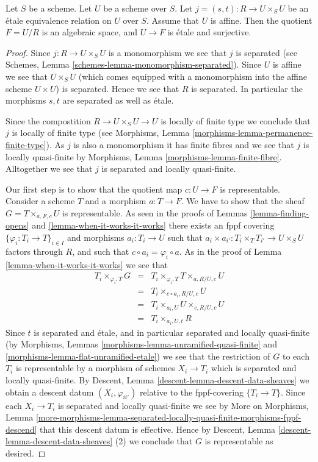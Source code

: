 \begin{lemma}
\label{lemma-presentation-quasi-compact}
Let $S$ be a scheme.
Let $U$ be a scheme over $S$.
Let $j = (s, t) : R \to U \times_S U$
be an \'etale equivalence relation on $U$ over $S$.
Assume that $U$ is affine. Then the quotient $F = U/R$
is an algebraic space, and $U \to F$ is \'etale and surjective.
\end{lemma}

\begin{proof}
Since $j : R \to U \times_S U$ is a monomorphism we see that $j$ is separated
(see Schemes, Lemma \ref{schemes-lemma-monomorphism-separated}).
Since $U$ is affine we see that $U \times_S U$
(which comes equipped with a monomorphism into the affine scheme
$U \times U$) is separated. Hence we see that $R$ is separated.
In particular the morphisms $s, t$ are separated as well as \'etale.

\medskip\noindent
Since the compostition $R \to U \times_S U \to U$ is
locally of finite type we conclude that
$j$ is locally of finite type (see
Morphisms, Lemma \ref{morphisms-lemma-permanence-finite-type}).
As $j$ is also a monomorphism it has finite fibres and
we see that $j$ is locally quasi-finite by
Morphisms, Lemma \ref{morphisms-lemma-finite-fibre}.
Alltogether we see that $j$ is separated and locally quasi-finite.

\medskip\noindent
Our first step is to show that the quotient map
$c : U \to F$ is representable.
Consider a scheme $T$ and a morphism $a : T \to F$.
We have to show that the sheaf $G = T \times_{a, F, c} U$
is representable.
As seen in the proofs of Lemmas \ref{lemma-finding-opens} and
\ref{lemma-when-it-works-it-works} there exists an fppf covering
$\{\varphi_i : T_i \to T\}_{i \in I}$ and morphisms $a_i : T_i \to U$
such that $a_i \times a_{i'} : T_i \times_T T_{i'} \to U \times_S U$
factors through $R$, and such that $c \circ a_i = \varphi_i \circ a$.
As in the proof of Lemma \ref{lemma-when-it-works-it-works} we see that
\begin{eqnarray*}
T_i \times_{\varphi_i, T} G & = &
T_i \times_{\varphi_i, T} T \times_{a, R/U, c} U \\
& = & T_i \times_{c \circ a_i, R/U, c} U \\
& = & T_i \times_{a_i, U} U \times_{c, R/U, c} U \\
& = & T_i \times_{a_i, U, t} R
\end{eqnarray*}
Since $t$ is separated and \'etale, and in particular
separated and locally quasi-finite (by Morphisms, Lemmas
\ref{morphisms-lemma-unramified-quasi-finite} and
\ref{morphisms-lemma-flat-unramified-etale})
we see that the restriction
of $G$ to each $T_i$ is representable by a morphism of schemes
$X_i \to T_i$ which is separated and locally quasi-finite. By
Descent, Lemma \ref{descent-lemma-descent-data-sheaves}
we obtain a descent datum $(X_i, \varphi_{ii'})$ relative
to the fppf-covering $\{T_i \to T\}$. Since each
$X_i \to T_i$ is separated and locally quasi-finite we see by
More on Morphisms, Lemma
\ref{more-morphisms-lemma-separated-locally-quasi-finite-morphisms-fppf-descend}
that this descent datum is effective.
Hence by
Descent, Lemma \ref{descent-lemma-descent-data-sheaves} (2)
we conclude that $G$ is representable as desired.


\end{proof}
